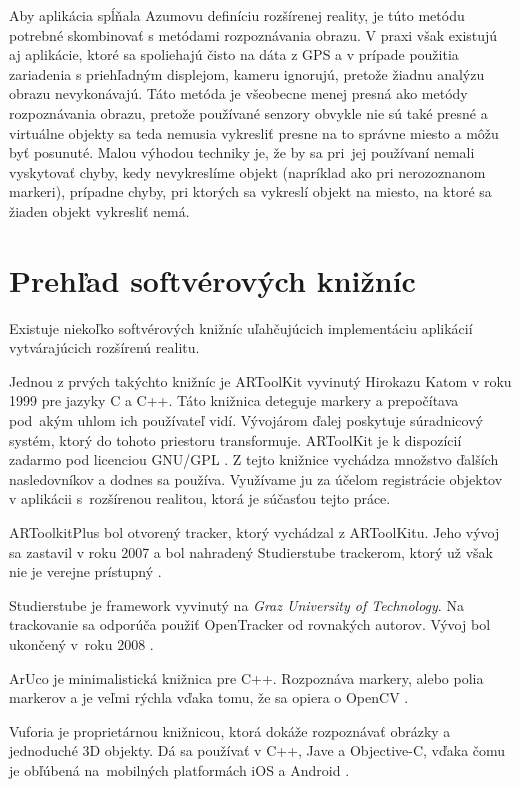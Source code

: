 Aby aplikácia spĺňala Azumovu definíciu rozšírenej reality, je túto metódu potrebné skombinovať s metódami rozpoznávania obrazu. V praxi však existujú aj aplikácie, ktoré sa spoliehajú čisto na dáta z GPS a v prípade použitia zariadenia s priehľadným displejom, kameru ignorujú, pretože žiadnu analýzu obrazu nevykonávajú. Táto metóda je všeobecne menej presná ako metódy rozpoznávania obrazu, pretože používané senzory obvykle nie sú také presné a virtuálne objekty sa teda nemusia vykresliť presne na to správne miesto a môžu byť posunuté. Malou výhodou techniky je, že by sa pri~jej používaní nemali vyskytovať chyby, kedy nevykreslíme objekt (napríklad ako pri nerozoznanom markeri), prípadne chyby, pri ktorých sa vykreslí objekt na miesto, na ktoré sa žiaden objekt vykresliť nemá.

\section{Prehľad softvérových knižníc }

Existuje niekoľko softvérových knižníc uľahčujúcich implementáciu aplikácií vytvárajúcich rozšírenú realitu.

Jednou z prvých takýchto knižníc je ARToolKit vyvinutý Hirokazu Katom v roku 1999 pre jazyky C a C++. Táto knižnica deteguje markery a prepočítava pod~akým uhlom ich používateľ vidí. Vývojárom ďalej poskytuje súradnicový systém, ktorý do tohoto priestoru transformuje. ARToolKit je k dispozícií zadarmo pod licenciou GNU/GPL \cite{ARToolKit-b}. Z tejto knižnice vychádza množstvo ďalších nasledovníkov a dodnes sa používa. Využívame ju za účelom registrácie objektov v aplikácii s~rozšírenou realitou, ktorá je súčasťou tejto práce.

ARToolkitPlus bol otvorený tracker, ktorý vychádzal z ARToolKitu. Jeho vývoj sa zastavil v roku 2007 a bol nahradený Studierstube trackerom, ktorý už však nie je verejne prístupný \cite{Wagner07}.

Studierstube je framework vyvinutý na \emph{Graz University of Technology}. Na trackovanie sa odporúča použiť OpenTracker od rovnakých autorov. Vývoj bol ukončený v~roku 2008 \cite{Studierstube-a, Studierstube-b}.

ArUco je minimalistická knižnica pre C++. Rozpoznáva markery, alebo polia markerov a je veľmi rýchla vďaka tomu, že sa opiera o OpenCV \cite{ArUco}.

Vuforia je proprietárnou knižnicou, ktorá dokáže rozpoznávať obrázky a jednoduché 3D objekty. Dá sa používať v C++, Jave a Objective-C, vďaka čomu je obľúbená na~mobilných platformách iOS a Android \cite{Vuforia}.